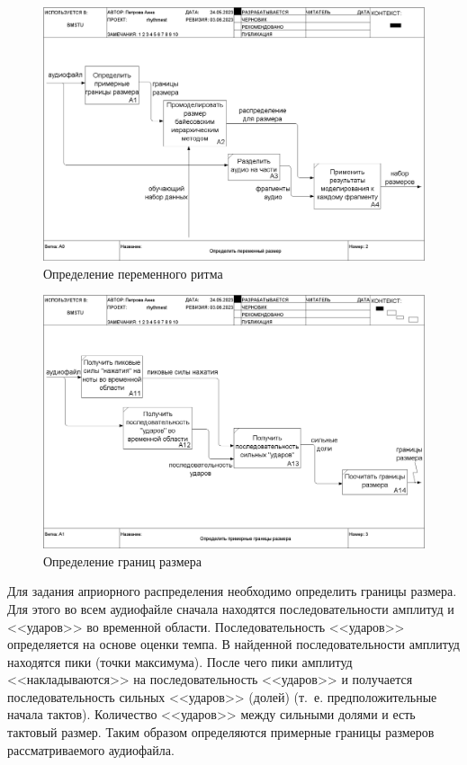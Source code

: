 \begin{figure}[h]
	\centering
	\includegraphics[scale=0.25]{inc/img/rhythm_idef/02_A0.png}
	\caption{Определение переменного ритма}
	\label{img:rhythm_1}
\end{figure}

\begin{figure}[h]
	\centering
	\includegraphics[scale=0.25]{inc/img/rhythm_idef/03_A1.png}
	\caption{Определение границ размера}
	\label{img:rhythm_2}
\end{figure}

\newpage

Для задания априорного распределения необходимо определить границы размера. Для этого во всем аудиофайле сначала находятся последовательности амплитуд и <<ударов>> во временной области. Последовательность <<ударов>> определяется на основе оценки темпа. В найденной последовательности амплитуд находятся пики (точки максимума). После чего пики амплитуд <<накладываются>> на последовательность <<ударов>> и получается последовательность сильных <<ударов>> (долей) (т.~е. предположительные начала тактов). Количество <<ударов>> между сильными долями и есть тактовый размер. Таким образом определяются примерные границы размеров рассматриваемого аудиофайла.

